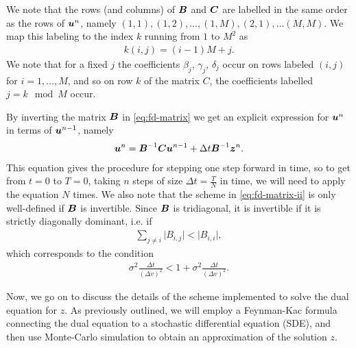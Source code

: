 We note that the rows (and columns) of $\boldsymbol{B}$ and $\boldsymbol{C}$ are labelled in the same order as the rows of $\boldsymbol{u}^n$, namely $(1,1),(1,2),\dots,(1,M),(2,1),\dots(M,M)$. We map this labeling to the index $k$ running from $1$ to $M^2$ as 
%
\begin{align}
    k(i,j) = (i-1)M + j.
\end{align}
%
We note that for a fixed $j$ the coefficients $\beta_j$, $\gamma_j$, $\delta_j$ occur on rows labeled $(i,j)$ for $i=1,\dots,M$, and so on row $k$ of the matrix $C$, the coefficients labelled $j = k \mod M$ occur.

By inverting the matrix $\boldsymbol{B}$ in \autoref{eq:fd-matrix} we get an explicit expression for $\boldsymbol{u}^n$ in terms of $\boldsymbol{u}^{n-1}$, namely
%
\begin{align} 
    \label{eq:fd-matrix-ii}
    \boldsymbol{u}^n = \boldsymbol{B}^{-1}\boldsymbol{C}\boldsymbol{u}^{n-1} + \Delta t \boldsymbol{B}^{-1}\boldsymbol{z}^n.
\end{align}
%
This equation gives the procedure for stepping one step forward in time, so to get from $t=0$ to $T=0$, taking $n$ steps of size $\Delta t = \frac{T}{N}$ in time, we will need to apply the equation $N$ times. We also note that the scheme in \autoref*{eq:fd-matrix-ii} is only well-defined if $\boldsymbol{B}$ is invertible. Since $\boldsymbol{B}$ is tridiagonal, it is invertible if it is strictly diagonally dominant, i.e. if
%
\begin{align} 
    \sum_{j\neq i} \lvert B_{i,j} \rvert < \lvert B_{i,i} \rvert,  
\end{align}
%
which corresponds to the condition 
%
\begin{align}
    \sigma^2 \frac{\Delta t}{(\Delta v)^2} < 1 + \sigma^2 \frac{\Delta t}{(\Delta v)^2}.
\end{align}
%

Now, we go on to discuss the details of the scheme implemented to solve the dual equation for $z$. As previously outlined, we will employ a Feynman-Kac formula connecting the dual equation to a stochastic differential equation (SDE), and then use Monte-Carlo simulation to obtain an approximation of the solution $z$.

